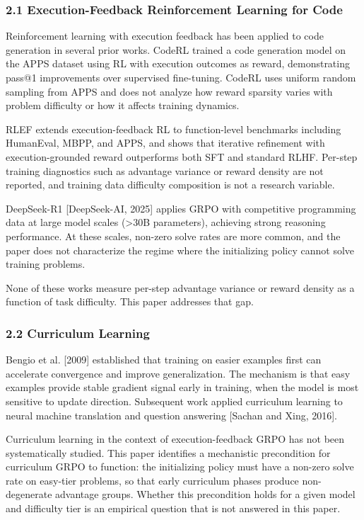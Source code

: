 
\subsubsection{2.1 Execution-Feedback Reinforcement Learning for Code}

Reinforcement learning with execution feedback has been applied to code generation in several prior works. CodeRL \citep{Leetal2022} trained a code generation model on the APPS dataset using RL with execution outcomes as reward, demonstrating pass@1 improvements over supervised fine-tuning. CodeRL uses uniform random sampling from APPS and does not analyze how reward sparsity varies with problem difficulty or how it affects training dynamics.

RLEF \citep{Gehringetal2024} extends execution-feedback RL to function-level benchmarks including HumanEval, MBPP, and APPS, and shows that iterative refinement with execution-grounded reward outperforms both SFT and standard RLHF. Per-step training diagnostics such as advantage variance or reward density are not reported, and training data difficulty composition is not a research variable.

DeepSeek-R1 [DeepSeek-AI, 2025] applies GRPO with competitive programming data at large model scales (>30B parameters), achieving strong reasoning performance. At these scales, non-zero solve rates are more common, and the paper does not characterize the regime where the initializing policy cannot solve training problems.

None of these works measure per-step advantage variance or reward density as a function of task difficulty. This paper addresses that gap.

\subsubsection{2.2 Curriculum Learning}

Bengio et al. [2009] established that training on easier examples first can accelerate convergence and improve generalization. The mechanism is that easy examples provide stable gradient signal early in training, when the model is most sensitive to update direction. Subsequent work applied curriculum learning to neural machine translation \citep{Plataniosetal2019} and question answering [Sachan and Xing, 2016].

Curriculum learning in the context of execution-feedback GRPO has not been systematically studied. This paper identifies a mechanistic precondition for curriculum GRPO to function: the initializing policy must have a non-zero solve rate on easy-tier problems, so that early curriculum phases produce non-degenerate advantage groups. Whether this precondition holds for a given model and difficulty tier is an empirical question that is not answered in this paper.

